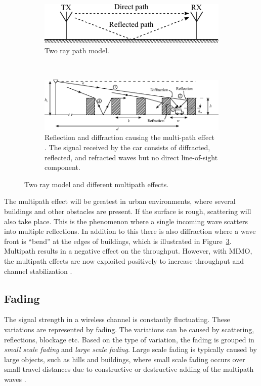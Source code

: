 \begin{figure}[htbp]
    \centering
    \begin{subfigure}[b]{0.6\textwidth} 
        \centering
        \includegraphics[scale=0.8]{img/analysis/tworay}
        \caption{Two ray path model.}
        \label{fig:mul_tworay}
    \end{subfigure}
    \\
    \begin{subfigure}[b]{0.7\textwidth} 
        \centering
        \includegraphics{img/analysis/parsons_multipath}
        \caption{Reflection and diffraction causing the multi-path effect \cite{parsons2000mobile}. The signal received by the car consists of diffracted, reflected, and refracted waves but no direct line-of-sight component.}
        \label{fig:mul_reflec_diffrac}
    \end{subfigure}
    \caption{Two ray model and different multipath effects.}
\end{figure}

The multipath effect will be greatest in urban environments, where several buildings and other obstacles are present. If the surface is rough, scattering will also take place. This is the phenomenon where a single incoming wave scatters into multiple reflections. In addition to this there is also diffraction where a wave front is ``bend'' at the edges of buildings, which is illustrated in Figure~\ref{fig:mul_reflec_diffrac}. Multipath results in a negative effect on the throughput. However, with MIMO, the multipath effects are now exploited positively to increase throughput and channel stabilization \cite{parsons2000mobile}.

\subsection{Fading}
The signal strength in a wireless channel is constantly fluctuating. These variations are represented by fading. The variations can be caused by scattering, reflections, blockage etc. Based on the type of variation, the fading is grouped in \emph{small scale fading} and \emph{large scale fading}. Large scale fading is typically caused by large objects, such as hills and buildings, where small scale fading occurs over small travel distances due to constructive or destructive adding of the multipath waves \cite{parsons2000mobile}.

